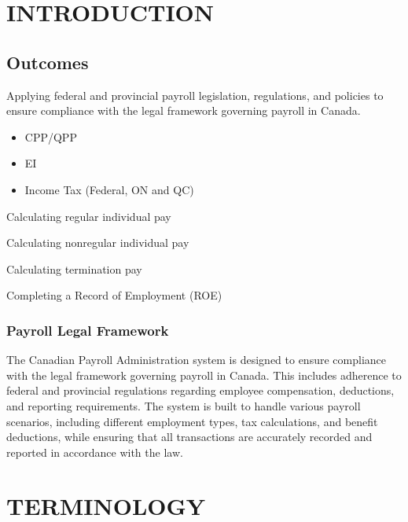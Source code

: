 \documentclass[letterpaper,10pt,english]{sphinxmanual}
\begin{document}
\sphinxstepscope


\chapter{INTRODUCTION}
\label{\detokenize{introduction:introduction}}\label{\detokenize{introduction::doc}}

\section{Outcomes}
\label{\detokenize{introduction:outcomes}}
\sphinxAtStartPar
Applying federal and provincial payroll legislation, regulations, and policies to ensure compliance with the legal framework governing payroll in Canada.
\begin{itemize}
\item {} 
\sphinxAtStartPar
CPP/QPP

\item {} 
\sphinxAtStartPar
EI

\item {} 
\sphinxAtStartPar
Income Tax (Federal, ON and QC)

\end{itemize}

\sphinxAtStartPar
Calculating regular individual pay

\sphinxAtStartPar
Calculating non\sphinxhyphen{}regular individual pay

\sphinxAtStartPar
Calculating termination pay

\sphinxAtStartPar
Completing a Record of Employment (ROE)


\subsection{Payroll Legal Framework}
\label{\detokenize{introduction:payroll-legal-framework}}
\sphinxAtStartPar
The Canadian Payroll Administration system is designed to ensure compliance with the legal framework governing payroll in Canada. This includes adherence to federal and provincial regulations regarding employee compensation, deductions, and reporting requirements.
The system is built to handle various payroll scenarios, including different employment types, tax calculations, and benefit deductions, while ensuring that all transactions are accurately recorded and reported in accordance with the law.

\sphinxstepscope


\chapter{TERMINOLOGY}
\label{\detokenize{terminology:terminology}}\label{\detokenize{terminology::doc}}
\end{document}
